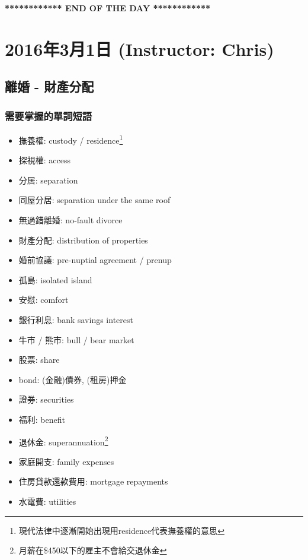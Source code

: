 \vspace{15mm}

\begin{center}
  \textbf{************ END OF THE DAY ************}
\end{center}
\newpage

\section{2016年3月1日 (Instructor: Chris)}
\subsection{離婚 - 財產分配}
\subsubsection*{需要掌握的單詞短語}
\begin{multicols}{2}
\begin{itemize}
  \itemsep0em
  \item 撫養權: custody / residence\footnote{現代法律中逐漸開始出現用residence代表撫養權的意思}
  \item 探視權: access
  \item 分居: separation
  \item 同屋分居: separation under the same roof
  \item 無過錯離婚: no-fault divorce
  \item 財產分配: distribution of properties
  \item 婚前協議: pre-nuptial agreement / prenup
  \item 孤島: isolated island
  \item 安慰: comfort
  \item 銀行利息: bank savings interest
  \item 牛市 / 熊市: bull / bear market
  \item 股票: share
  \item bond: (金融)債券, (租房)押金
  \item 證券: securities
  \item 福利: benefit
  \item 退休金: superannuation\footnote{月薪在\$450以下的雇主不會給交退休金}
  \item 家庭開支: family expenses
  \item 住房貸款還款費用: mortgage repayments
  \item 水電費: utilities
\end{itemize}
\end{multicols}

